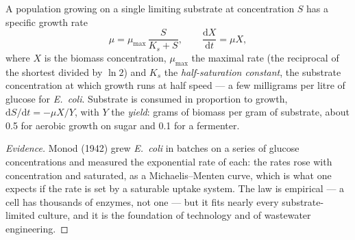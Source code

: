 \begin{theorem}\label{thm:b2:microbial-metabolism:monod}
A population growing on a single limiting substrate at concentration
$S$ has a specific growth rate
\[
\mu = \mu_{\max}\,\frac{S}{K_s + S}, \qquad \frac{\mathrm{d}X}{\mathrm{d}t} = \mu X,
\]
where $X$ is the biomass concentration, $\mu_{\max}$ the maximal
rate (the reciprocal of the shortest  divided by
$\ln 2$) and $K_s$ the \emph{half-saturation constant}, the
substrate concentration at which growth runs at half speed --- a few
milligrams per litre of glucose for \emph{E.~coli}. Substrate is
consumed in proportion to growth, $\mathrm{d}S/\mathrm{d}t =
-\mu X/Y$, with $Y$ the \emph{yield}: grams of biomass per gram of
substrate, about \num{0.5} for aerobic growth on sugar and \num{0.1}
for a fermenter.
\end{theorem}
\begin{proof}[Evidence]
Monod (1942) grew \emph{E.~coli} in batches on a series of glucose
concentrations and measured the exponential rate of each: the rates
rose with concentration and saturated, as a Michaelis--Menten curve,
which is what one expects if the rate is set by a saturable uptake
system. The law is empirical --- a cell has thousands of enzymes,
not one --- but it fits nearly every substrate-limited culture, and
it is the foundation of  technology and of wastewater
engineering.
\end{proof}

